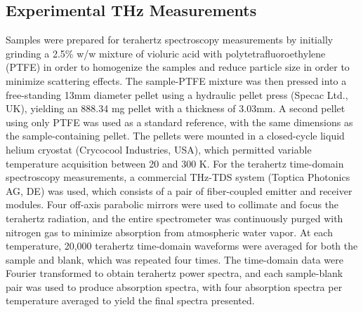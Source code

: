 \subsection{Experimental THz Measurements}
Samples were prepared for terahertz spectroscopy measurements by initially grinding a 2.5\% w/w mixture of violuric acid with polytetrafluoroethylene (PTFE) in order to homogenize the samples and reduce particle size in order to minimize scattering effects. The sample-PTFE mixture was then pressed into a free-standing 13mm diameter pellet using a hydraulic pellet press (Specac Ltd., UK), yielding an 888.34 mg pellet with a thickness of 3.03mm. A second pellet using only PTFE was used as a standard reference, with the same dimensions as the sample-containing pellet. The pellets were mounted in a closed-cycle liquid helium cryostat (Crycocool Industries, USA), which permitted variable temperature acquisition between 20 and 300 K. For the terahertz time-domain spectroscopy measurements, a commercial THz-TDS system (Toptica Photonics AG, DE) was used, which consists of a pair of fiber-coupled emitter and receiver modules. Four off-axis parabolic mirrors were used to collimate and focus the terahertz radiation, and the entire spectrometer was continuously purged with nitrogen gas to minimize absorption from atmospheric water vapor. At each temperature, 20,000 terahertz time-domain waveforms were averaged for both the sample and blank, which was repeated four times. The time-domain data were Fourier transformed to obtain terahertz power spectra, and each sample-blank pair was used to produce absorption spectra, with four absorption spectra per temperature averaged to yield the final spectra presented. 
